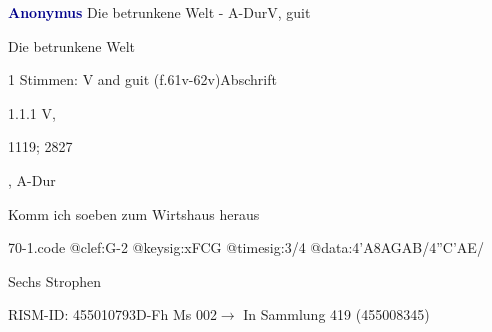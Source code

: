 \documentclass[twocolumn]{book}
\begin{document}
\par \vspace{7pt} \textcolor{darkblue}{\textbf{Anonymus  }}\hfillplus{\textbf{[70]}}\newline Die betrunkene Welt - A-Dur\newline V, guit
\par \begin{itshape}[heading, f.61v:] Die betrunkene Welt\end{itshape} 
\par \textcolor{darkblue}{}  1 Stimmen: V and guit  (f.61v-62v)\newline Abschrift
\par 1.1.1  V, \begin{itshape}1119; 2827\end{itshape}, A-Dur\newline \begin{footnotesize} Komm ich soeben zum Wirtshaus heraus \end{footnotesize}  
\begin{filecontents*}{70-1.code}
@clef:G-2
@keysig:xFCG
@timesig:3/4
@data:4'A{8AG}{AB}/4''C'AE/
\end{filecontents*}
\newline
%
\par Sechs Strophen
\par RISM-ID: 455010793\newline D-Fh  Ms 002\newline $\rightarrow$ In Sammlung 419 (455008345)
      
\end{document}
